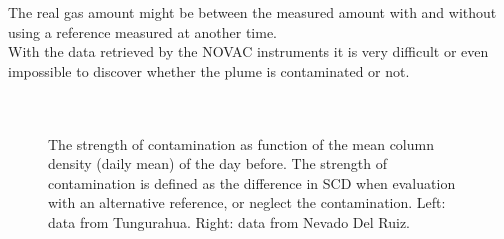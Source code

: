 The real gas amount might be between the measured amount with and without using a reference measured at another time.\\
%
With the data retrieved by the NOVAC instruments it is very difficult or even impossible to discover whether the plume is contaminated or not. \\
\\
\\
\begin{figure}
	\caption{The strength of contamination as function of the mean  column density (daily mean) of the day before. The strength of contamination is defined as the difference in  SCD  when evaluation with an alternative reference, or neglect the contamination. Left: data from Tungurahua. Right: data from Nevado Del Ruiz. }
	\label{fig:contaminationdependencyso2}
\end{figure}


